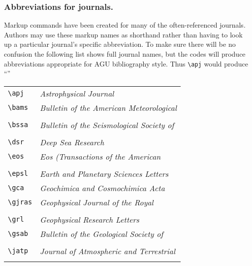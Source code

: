\subsubsection{Abbreviations for journals.}  
Markup commands have been created for many of the often-referenced 
journals.  Authors may use these markup names as shorthand rather 
than having to look up a particular journal's specific abbreviation.
To make sure there will be no confusion the following list shows full 
journal names, but the codes will produce abbreviations appropriate 
for AGU bibliography style.  Thus \verb"\apj" would produce ``\apj''
\vspace{-10pt}
\begin{center}\begin{tabular}{ll}
\verb"\apj"    & {\it Astrophysical Journal}\\
\verb"\bams"   & {\it Bulletin of the American Meteorological}\\
	       & \hspace{2em}{\it Society}\\
\verb"\bssa"   & {\it Bulletin of the Seismological Society of}\\
               & \hspace{2em}{\it America}\\
\verb"\dsr"    & {\it Deep Sea Research}\\
\verb"\eos"    & {\it Eos (Transactions of the American}\\
               & \hspace{2em}{\it Geophysical Union)}\\
\verb"\epsl"   & {\it Earth and Planetary Sciences Letters}\\
\verb"\gca"    & {\it Geochimica and Cosmochimica Acta}\\
\verb"\gjras"  & {\it Geophysical Journal of the Royal}\\
               & \hspace{2em}{\it Astronomical Society}\\
\verb"\grl"    & {\it Geophysical Research Letters}\\
\verb"\gsab"   & {\it Bulletin of the Geological Society of}\\
               & \hspace{2em}{\it America}\\
\verb"\jatp"   & {\it Journal of Atmospheric and Terrestrial}\\
               & \hspace{2em}{\it Physics}\\

\end{tabular}
\end{center}
